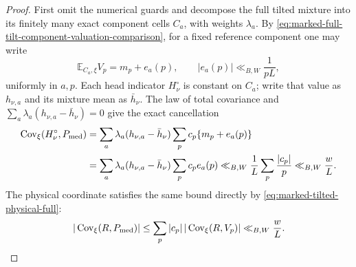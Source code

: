\documentclass[11pt]{article}
\numberwithin{equation}{section}
\theoremstyle{definition}
\theoremstyle{remark}
\newcommand{\1}{\mathbf 1}
\begin{document}
\begin{proof}
First omit the numerical guards and decompose the full tilted mixture
into its finitely many exact component cells \(C_a\), with weights
\(\lambda_a\).  By
\eqref{eq:marked-full-tilt-component-valuation-comparison}, for a fixed
reference component one may write
\[
 \mathbb E_{C_a,\xi}V_p=m_p+e_a(p),
 \qquad |e_a(p)|\ll_{B,W}\frac1{pL},
\]
uniformly in \(a,p\).  Each head indicator \(H_\nu^\circ\) is constant on
\(C_a\); write that value as \(h_{\nu,a}\) and its mixture mean as
\(\bar h_\nu\).  The law of total covariance and
\(\sum_a\lambda_a(h_{\nu,a}-\bar h_\nu)=0\) give the exact cancellation
\begin{align}
 \operatorname{Cov}_\xi(H_\nu^\circ,P_{\rm med})
 &=\sum_a\lambda_a(h_{\nu,a}-\bar h_\nu)
       \sum_pc_p\{m_p+e_a(p)\}\notag\\
 &=\sum_a\lambda_a(h_{\nu,a}-\bar h_\nu)
       \sum_pc_pe_a(p)
 \ll_{B,W}\frac1L\sum_p\frac{|c_p|}{p}
 \ll_{B,W}\frac wL.
 \label{eq:smooth-explicit-head-postband-cancellation}
\end{align}
The physical coordinate satisfies the same bound directly by
\eqref{eq:marked-tilted-physical-full}:
\begin{equation}
 |\operatorname{Cov}_\xi(R,P_{\rm med})|
 \leq\sum_p|c_p|\,|\operatorname{Cov}_\xi(R,V_p)|
 \ll_{B,W}\frac wL.
 \label{eq:smooth-explicit-physical-postband-cancellation}
\end{equation}


\end{proof}
\end{document}
